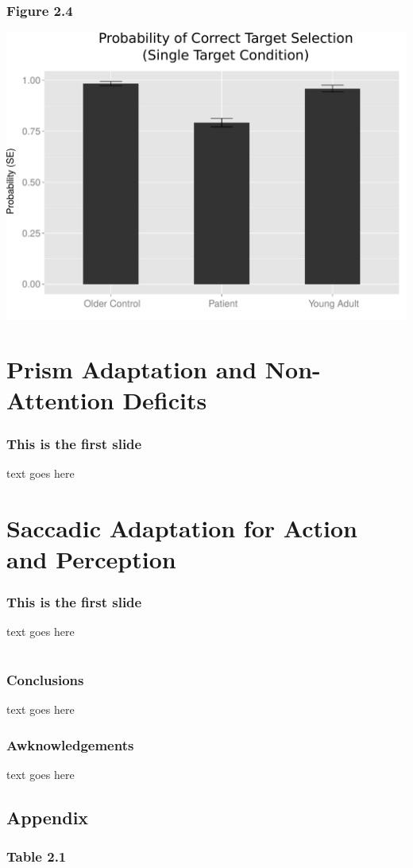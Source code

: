 \documentclass{beamer}
\begin{document}


 

 \section[Prisms]{Prism Adaptation and Non-Attention Deficits} 

 \begin{frame}
  \frametitle{This is the first slide}
  text goes here
 \end{frame}

\section[Saccadic Adaptation]{Saccadic Adaptation for Action and Perception} 

 \begin{frame}
  \frametitle{This is the first slide}
  text goes here
 \end{frame}

\section*{}
\begin{frame}
  \frametitle{Conclusions}
  text goes here
 \end{frame}

 \begin{frame}
  \frametitle{Awknowledgements}
  text goes here
 \end{frame}


\subsection*{Appendix}
\begin{frame}
  \frametitle{Table 2.1}
 \end{frame}


 
\end{document}
